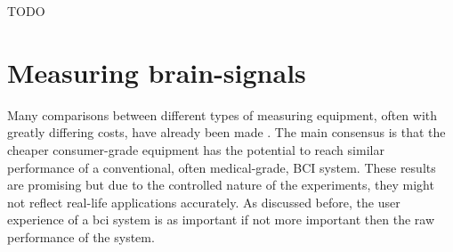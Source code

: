 

TODO


\section{Measuring brain-signals}
\label{sec:biomedical_signals_measuring}




Many comparisons between different types of measuring equipment, often with greatly differing costs, have already been made \citep{bci_cheap_viability1, bci_cheap_viability2, bci_cheap_viability3, bci_cheap_viability4, bci_cheap_viability5}.
The main consensus is that the cheaper consumer-grade equipment has the potential to reach similar performance of a conventional, often medical-grade, BCI system.
These results are promising but due to the controlled nature of the experiments, they might not reflect real-life applications accurately.
As discussed before, the user experience of a \gls{bci} system is as important if not more important then the raw performance of the system.

